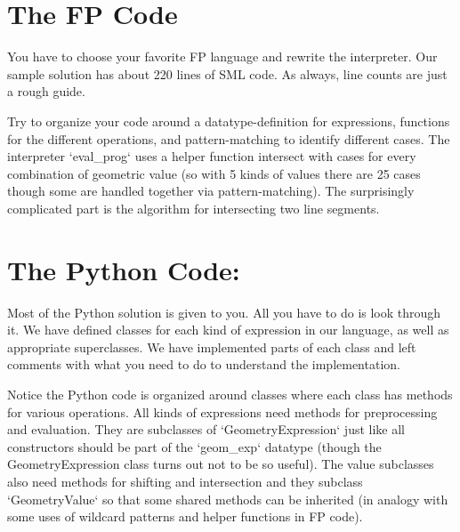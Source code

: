 \documentclass[a4paper,12pt]{article}
\begin{document}
\section*{The FP Code}
You have to choose your favorite FP language and rewrite the interpreter. Our sample solution has about 220 lines of SML code. As always, line counts are just a rough guide.

Try to organize your code around a datatype-definition for expressions, functions for the different operations, and pattern-matching to identify different cases. The interpreter `eval\_prog` uses a helper function intersect with cases for every combination of geometric value (so with 5 kinds of values there are 25 cases though some are handled together via pattern-matching). The surprisingly complicated part is the algorithm for intersecting two line segments.

\section*{The Python Code:}
Most of the Python solution is given to you. All you have to do is look through it. We have defined classes for each kind of expression in our language, as well as appropriate superclasses. We have implemented parts of each class and left comments with what you need to do to understand the implementation.

Notice the Python code is organized around classes where each class has methods for various operations. All kinds of expressions need methods for preprocessing and evaluation. They are subclasses of `GeometryExpression` just like all constructors should be part of the `geom\_exp` datatype (though the GeometryExpression class turns out not to be so useful). The value subclasses also need methods for shifting and intersection and they subclass `GeometryValue` so that some shared methods can be inherited (in analogy with some uses of wildcard patterns and helper functions in FP code).
\end{document}

